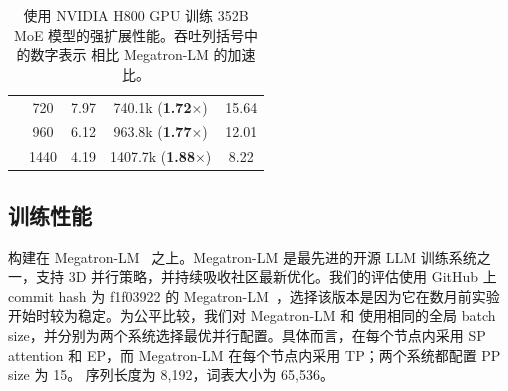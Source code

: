 \begin{table}[t!]
{\begin{tabular}{c|c|c|c|c}
            & 720 & 7.97 & 740.1k (\textbf{1.72$\times$}) & 15.64 \\
            & 960 & 6.12 & 963.8k (\textbf{1.77$\times$}) & 12.01 \\
            & 1440 & 4.19 & 1407.7k (\textbf{1.88$\times$}) & 8.22 \\
            \hline
            \hline
        \end{tabular}
    }
    \caption{使用 NVIDIA H800 GPU 训练 352B MoE 模型的强扩展性能。吞吐列括号中的数字表示 \sysname 相比 Megatron-LM 的加速比。}
    \vspace{-0.2in}
    \label{tab:evaluation:strong-scaling}
\end{table}

\subsection{训练性能}
\label{sec:evaluation:performance}

\sysname 构建在 Megatron-LM~\cite{shoeybi2019megatron} 之上。Megatron-LM 是最先进的开源 LLM 训练系统之一，支持 3D 并行策略，并持续吸收社区最新优化。我们的评估使用 GitHub 上 commit hash 为 f1f03922 的 Megatron-LM~\cite{megatron-lm}，选择该版本是因为它在数月前实验开始时较为稳定。为公平比较，我们对 Megatron-LM 和 \sysname 使用相同的全局 batch size，并分别为两个系统选择最优并行配置。具体而言，\sysname 在每个节点内采用 SP attention 和 EP，而 Megatron-LM 在每个节点内采用 TP；两个系统都配置 PP size 为 15。 序列长度为 8,192，词表大小为 65,536。

